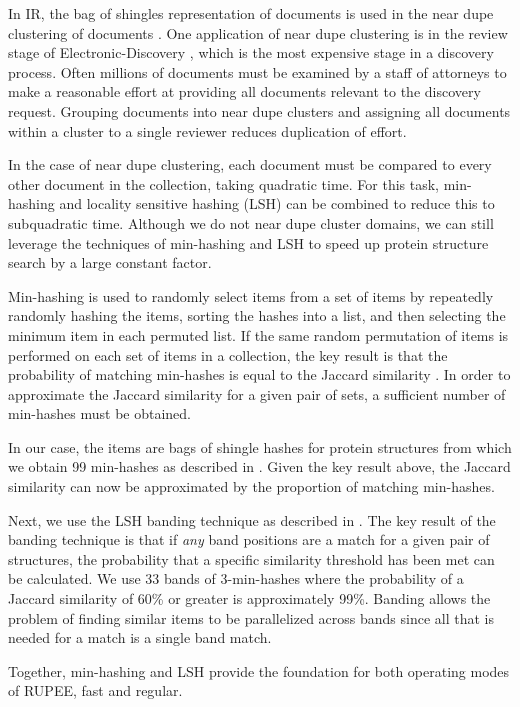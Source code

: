 \documentclass[a4,center,fleqn]{NAR}
\begin{document}
In IR, the bag of shingles representation of documents is used in the near dupe clustering of documents \cite{Broder1997b}.
One application of near dupe clustering is in the review stage of Electronic-Discovery \cite{Joshi2008}, which is the most expensive stage in a discovery process. 
Often millions of documents must be examined by a staff of attorneys to make a reasonable effort at providing all documents relevant to the discovery request. 
Grouping documents into near dupe clusters and assigning all documents within a cluster to a single reviewer reduces duplication of effort. 

In the case of near dupe clustering, each document must be compared to every other document in the collection, taking quadratic time.
For this task, min-hashing \cite{Broder1998} and locality sensitive hashing (LSH) \cite{Indyk1998} can be combined to reduce this to subquadratic time. 
Although we do not near dupe cluster domains, we can still leverage the techniques of min-hashing and LSH to speed up protein structure search by a large constant factor.

Min-hashing is used to randomly select items from a set of items by repeatedly randomly hashing the items, sorting the hashes into a list, and then selecting the minimum item in each permuted list.
If the same random permutation of items is performed on each set of items in a collection, the key result is that the probability of matching min-hashes is equal to the Jaccard similarity \cite{Broder1998}.
In order to approximate the Jaccard similarity for a given pair of sets, a sufficient number of min-hashes must be obtained. 

In our case, the items are bags of shingle hashes for protein structures from which we obtain 99 min-hashes as described in \cite{Rajaraman2012}. 
Given the key result above, the Jaccard similarity can now be approximated by the proportion of matching min-hashes. 

Next, we use the LSH banding technique as described in \cite{Rajaraman2012}.
The key result of the banding technique is that if \emph{any} band positions are a match for a given pair of structures, the probability that a specific similarity threshold has been met can be calculated. 
We use 33 bands of 3-min-hashes where the probability of a Jaccard similarity of 60\% or greater is approximately 99\%. 
Banding allows the problem of finding similar items to be parallelized across bands since all that is needed for a match is a single band match. 

Together, min-hashing and LSH provide the foundation for both operating modes of RUPEE, fast and regular.
\end{document}
